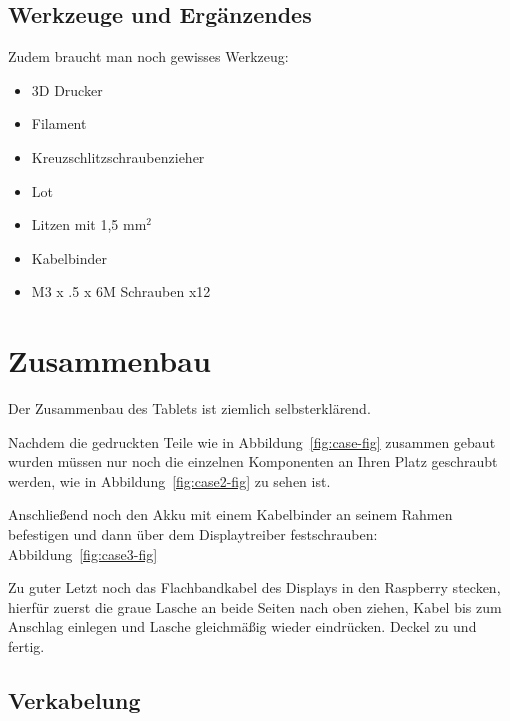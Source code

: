 \subsection{Werkzeuge und Ergänzendes}
Zudem braucht man noch gewisses Werkzeug:
\begin{itemize}
\item 3D Drucker 
\item Filament  
\item Kreuzschlitzschraubenzieher 
\item Lot 
\item Litzen mit 1,5 mm$^2$
\item Kabelbinder
\item M3 x .5 x 6M Schrauben x12
\end{itemize}

\section{Zusammenbau}

Der Zusammenbau des Tablets ist ziemlich selbsterklärend.


Nachdem die gedruckten Teile wie in Abbildung~\ref{fig:case-fig} zusammen gebaut wurden müssen nur noch die einzelnen Komponenten an Ihren Platz geschraubt werden, wie in Abbildung~\ref{fig:case2-fig} zu sehen ist.


Anschließend noch den Akku mit einem Kabelbinder an seinem Rahmen befestigen und dann über dem Displaytreiber festschrauben: Abbildung~\ref{fig:case3-fig}


Zu guter Letzt noch das Flachbandkabel des Displays in den Raspberry stecken, hierfür zuerst die graue Lasche an beide Seiten nach oben ziehen, Kabel bis zum Anschlag einlegen und Lasche gleichmäßig wieder eindrücken. Deckel zu und fertig.


\subsection{Verkabelung}

